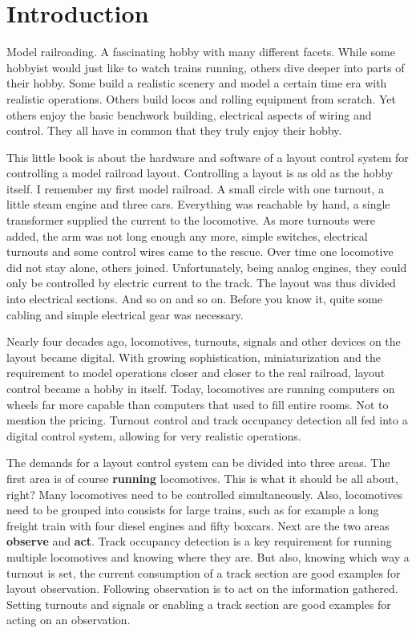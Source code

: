 \chapter{Introduction}

Model railroading. A fascinating hobby with many different facets. While some hobbyist would just like to watch trains running, others dive deeper into parts of their hobby. Some build a realistic scenery and model a certain time era with realistic operations. Others build locos and rolling equipment from scratch. Yet others enjoy the basic benchwork building, electrical aspects of wiring and control. They all have in common that they truly enjoy their hobby.

This little book is about the hardware and software of a layout control system for controlling a model railroad layout. Controlling a layout is as old as the hobby itself. I remember my first model railroad. A small circle with one turnout, a little steam engine and three cars. Everything was reachable by hand, a single transformer supplied the current to the locomotive. As more turnouts were added, the arm was not long enough any more, simple switches, electrical turnouts and some control wires came to the rescue. Over time one locomotive did not stay alone, others joined. Unfortunately, being analog engines, they could only be controlled by electric current to the track. The layout was thus divided into electrical sections. And so on and so on. Before you know it, quite some cabling and simple electrical gear was necessary.

Nearly four decades ago, locomotives, turnouts, signals and other devices on the layout became digital. With growing sophistication, miniaturization and the requirement to model operations closer and closer to the real railroad, layout control became a hobby in itself. Today, locomotives are running computers on wheels far more capable than computers that used to fill entire rooms. Not to mention the pricing. Turnout control and track occupancy detection all fed into a digital control system, allowing for very realistic operations.

The demands for a layout control system can be divided into three areas. The first area is of course {\bf running} locomotives. This is what it should be all about, right? Many locomotives need to be controlled simultaneously. Also, locomotives need to be grouped into consists for large trains, such as for example a long freight train with four diesel engines and fifty boxcars. Next are the two areas {\bf observe} and {\bf act}. Track occupancy detection is a key requirement for running multiple locomotives and knowing where they are. But also, knowing which way a turnout is set, the current consumption of a track section are good examples for layout observation. Following observation is to act on the information gathered. Setting turnouts and signals or enabling a track section are good examples for acting on an observation.

